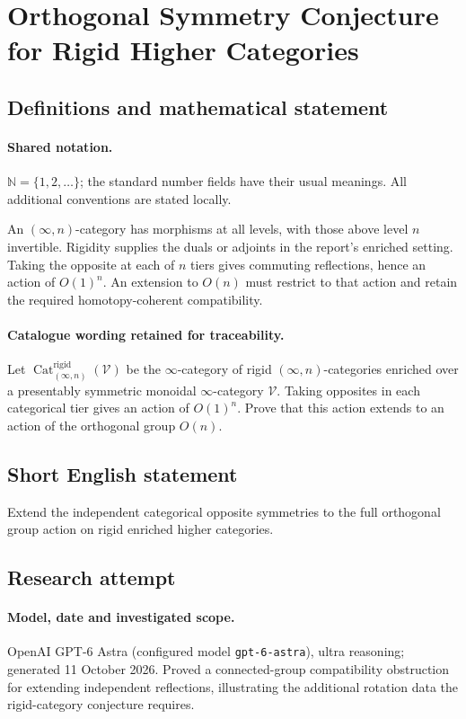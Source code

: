 \documentclass[11pt]{article}
\begin{document}
\section{Orthogonal Symmetry Conjecture for Rigid Higher Categories}\label{statement}

\subsection{Definitions and mathematical statement}

\paragraph{Shared notation.}$\mathbb N=\{1,2,\ldots\}$; the standard number fields have their usual meanings. All additional conventions are stated locally.


An $(\infty,n)$-category has morphisms at all levels, with those above level $n$ invertible. Rigidity supplies the duals or adjoints in the report's enriched setting. Taking the opposite at each of $n$ tiers gives commuting reflections, hence an action of $O(1)^n$. An extension to $O(n)$ must restrict to that action and retain the required homotopy-coherent compatibility.

\paragraph{Catalogue wording retained for traceability.}
Let $\operatorname{Cat}^{\mathrm{rigid}}_{(\infty,n)}(\mathcal{V})$ be the $\infty$-category of rigid $(\infty,n)$-categories enriched over a presentably symmetric monoidal $\infty$-category $\mathcal{V}$. Taking opposites in each categorical tier gives an action of $O(1)^n$. Prove that this action extends to an action of the orthogonal group $O(n)$.
\subsection{Short English statement}
Extend the independent categorical opposite symmetries to the full orthogonal group action on rigid enriched higher categories.
\subsection{Research attempt}
\paragraph{Model, date and investigated scope.}
OpenAI GPT-6 Astra (configured model \texttt{gpt-6-astra}), ultra reasoning; generated 11 October 2026. Proved a connected-group compatibility obstruction for extending independent reflections, illustrating the additional rotation data the rigid-category conjecture requires.
\end{document}
